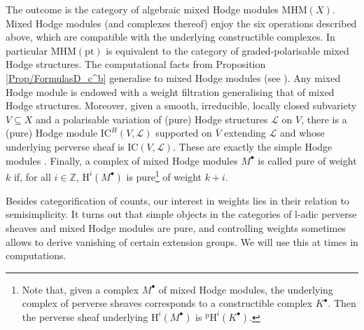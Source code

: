 \documentclass[11pt,english]{article}
\numberwithin{equation}{section}
\numberwithin{figure}{section}
\theoremstyle{definition}
\theoremstyle{plain}
\theoremstyle{remark}
\newcommand\HH{\mathrm{H}}
\newcommand\ZZ{\mathbb{Z}}
\begin{document}
The outcome is the category of algebraic mixed Hodge modules $\mathrm{MHM}(X)$.
Mixed Hodge modules (and complexes thereof) enjoy the six operations
described above, which are compatible with the underlying constructible
complexes. In particular $\mathrm{MHM}(\mathrm{pt})$ is equivalent
to the category of graded-polarisable mixed Hodge structures. The
computational facts from Proposition \ref{Prop/FormulasD_c^b} generalise
to mixed Hodge modules (see \cite[\S 4.3-4.4.]{Sai89}\cite{MSS11}).
Any mixed Hodge module is endowed with a weight filtration generalising
that of mixed Hodge structures. Moreover, given a smooth, irreducible,
locally closed subvariety $V\subseteq X$ and a polarisable variation
of (pure) Hodge structures $\mathcal{L}$ on $V$, there is a (pure)
Hodge module $\mathrm{IC}^{H}(V,\mathcal{L})$ supported on $\overline{V}$
extending $\mathcal{L}$ and whose underlying perverse sheaf is $\mathrm{IC}(V,\mathcal{L})$.
These are exactly the simple Hodge modules \cite[Thm. 14.36.]{PS08}.
Finally, a complex of mixed Hodge modules $M^{\bullet}$ is called
pure of weight $k$ if, for all $i\in\ZZ$, $\HH^{i}(M^{\bullet})$
is pure\footnote{Note that, given a complex $M^{\bullet}$ of mixed Hodge modules,
the underlying complex of perverse sheaves corresponds to a constructible
complex $K^{\bullet}$. Then the perverse sheaf underlying $\HH^{i}(M^{\bullet})$
is $^{\mathrm{p}}\HH^{i}(K^{\bullet})$.} of weight $k+i$.

Besides categorification of counts, our interest in weights lies in
their relation to semisimplicity. It turns out that simple objects
in the categories of l-adic perverse sheaves and mixed Hodge modules
are pure, and controlling weights sometimes allows to derive vanishing
of certain extension groups. We will use this at times in computations.
\end{document}
